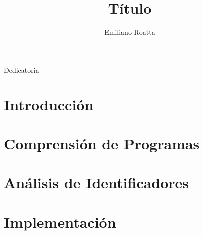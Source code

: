 \documentclass[a4paper,11pt,twoside,openright]{book}
\title{Título}
\author{Emiliano Roatta}
\begin{document}
\frontmatter

\maketitle

\begin{flushright}
\null{}
  Dedicatoria
\null
\end{flushright}



\tableofcontents
\listoffigures
\listoftables
\listofalgorithms

\mainmatter
\chapter{Introducción}


\chapter{Comprensión de Programas}






\chapter{Análisis de Identificadores}




\chapter{Implementación}






\backmatter
\end{document}
